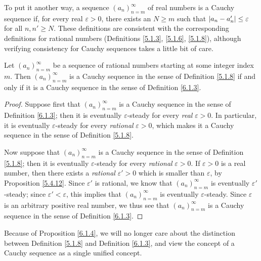 \begin{note}
    To put it another way, a sequence \((a_n)_{n = m}^\infty\) of real numbers is a Cauchy sequence if, for every real \(\varepsilon > 0\), there exists an \(N \geq m\) such that \(\abs*{a_n - a_n'} \leq \varepsilon\) for all \(n, n' \geq N\).
    These definitions are consistent with the corresponding definitions for rational numbers (Definitions \ref{5.1.3}, \ref{5.1.6}, \ref{5.1.8}), although verifying consistency for Cauchy sequences takes a little bit of care.
\end{note}

\begin{proposition}\label{6.1.4}
    Let \((a_n)_{n = m}^\infty\) be a sequence of rational numbers starting at some integer index \(m\).
    Then \((a_n)_{n = m}^\infty\) is a Cauchy sequence in the sense of Definition \ref{5.1.8} if and only if it is a Cauchy sequence in the sense of Definition \ref{6.1.3}.
\end{proposition}

\begin{proof}
    Suppose first that \((a_n)_{n = m}^\infty\) is a Cauchy sequence in the sense of Definition \ref{6.1.3};
    then it is eventually \(\varepsilon\)-steady for every \emph{real} \(\varepsilon > 0\).
    In particular, it is eventually \(\varepsilon\)-steady for every \emph{rational} \(\varepsilon > 0\), which makes it a Cauchy sequence in the sense of Definition \ref{5.1.8}.

    Now suppose that \((a_n)_{n = m}^\infty\) is a Cauchy sequence in the sense of Definition \ref{5.1.8};
    then it is eventually \(\varepsilon\)-steady for every \emph{rational} \(\varepsilon > 0\).
    If \(\varepsilon > 0\) is a real number, then there exists a \emph{rational} \(\varepsilon' > 0\) which is smaller than \(\varepsilon\), by Proposition \ref{5.4.12}.
    Since \(\varepsilon'\) is rational, we know that \((a_n)_{n = m}^\infty\) is eventually \(\varepsilon'\)-steady;
    since \(\varepsilon' < \varepsilon\), this implies that \((a_n)_{n = m}^\infty\) is eventually \(\varepsilon\)-steady.
    Since \(\varepsilon\) is an arbitrary positive real number, we thus see that \((a_n)_{n = m}^\infty\) is a Cauchy sequence in the sense of Definition \ref{6.1.3}.
\end{proof}

\begin{note}
    Because of Proposition \ref{6.1.4}, we will no longer care about the distinction between Definition \ref{5.1.8} and Definition \ref{6.1.3}, and view the concept of a Cauchy sequence as a single unified concept.
\end{note}

